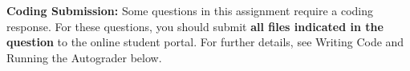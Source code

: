 {\bf Coding Submission:}
Some questions in this assignment require a coding response.  For these questions, you should submit \textbf{all files indicated in the question} to the online student portal.  For further details, see Writing Code and Running the Autograder below.